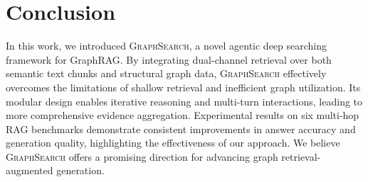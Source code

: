 \section{Conclusion}  
In this work, we introduced \textsc{GraphSearch}, a novel agentic deep searching framework for GraphRAG. By integrating dual-channel retrieval over both semantic text chunks and structural graph data, \textsc{GraphSearch} effectively overcomes the limitations of shallow retrieval and inefficient graph utilization. Its modular design enables iterative reasoning and multi-turn interactions, leading to more comprehensive evidence aggregation. Experimental results on six multi-hop RAG benchmarks demonstrate consistent improvements in answer accuracy and generation quality, highlighting the effectiveness of our approach. We believe \textsc{GraphSearch} offers a promising direction for advancing graph retrieval-augmented generation.
